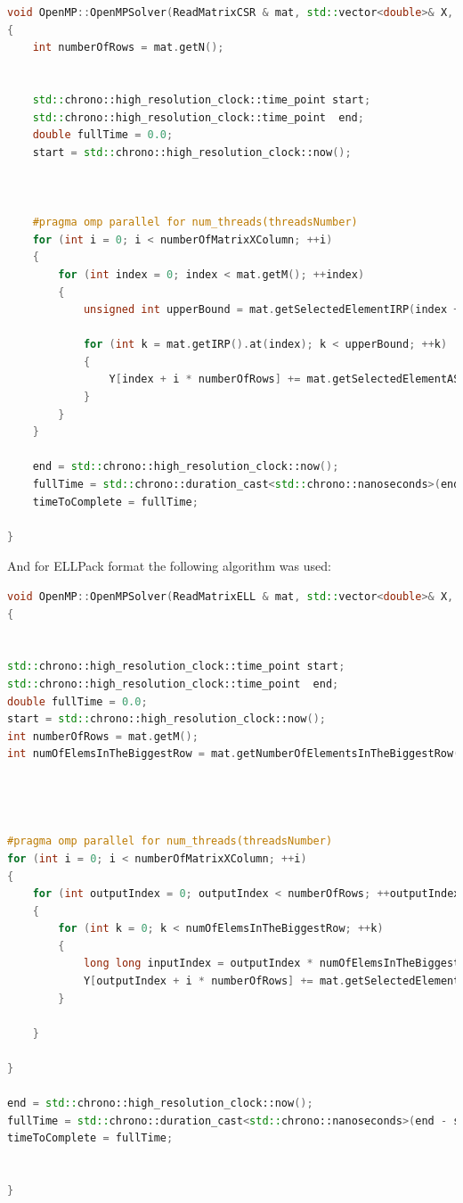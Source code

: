 \documentclass{scrreprt}
\begin{document}
\begin{lstlisting}[language=C++]
void OpenMP::OpenMPSolver(ReadMatrixCSR & mat, std::vector<double>& X, std::vector<double>& Y,  int threadsNumber, double & timeToComplete, unsigned int numberOfMatrixXColumn)
{
	int numberOfRows = mat.getN();


	std::chrono::high_resolution_clock::time_point start;
	std::chrono::high_resolution_clock::time_point  end;
	double fullTime = 0.0;
	start = std::chrono::high_resolution_clock::now();

	

	#pragma omp parallel for num_threads(threadsNumber)
	for (int i = 0; i < numberOfMatrixXColumn; ++i)
	{
		for (int index = 0; index < mat.getM(); ++index)
		{
			unsigned int upperBound = mat.getSelectedElementIRP(index + 1);

			for (int k = mat.getIRP().at(index); k < upperBound; ++k)
			{
				Y[index + i * numberOfRows] += mat.getSelectedElementAS(k) * X[mat.getSelectedElementJA(k)+ i * numberOfRows];
			}
		}
	}		

	end = std::chrono::high_resolution_clock::now();
	fullTime = std::chrono::duration_cast<std::chrono::nanoseconds>(end - start).count() / 1000000.0;
	timeToComplete = fullTime;	

}
\end{lstlisting}


And for ELLPack format the following algorithm was used:

\begin{lstlisting}[language=C++]
void OpenMP::OpenMPSolver(ReadMatrixELL & mat, std::vector<double>& X, std::vector<double>& Y, int threadsNumber, double & timeToComplete, unsigned int numberOfMatrixXColumn)
{	

	
std::chrono::high_resolution_clock::time_point start;
std::chrono::high_resolution_clock::time_point  end;
double fullTime = 0.0;
start = std::chrono::high_resolution_clock::now();
int numberOfRows = mat.getM();
int numOfElemsInTheBiggestRow = mat.getNumberOfElementsInTheBiggestRow();
	



#pragma omp parallel for num_threads(threadsNumber)
for (int i = 0; i < numberOfMatrixXColumn; ++i)
{
	for (int outputIndex = 0; outputIndex < numberOfRows; ++outputIndex)
	{
		for (int k = 0; k < numOfElemsInTheBiggestRow; ++k)
		{
			long long inputIndex = outputIndex * numOfElemsInTheBiggestRow + k;
			Y[outputIndex + i * numberOfRows] += mat.getSelectedElementAS(inputIndex) * X[mat.getSelectedElementJA(inputIndex) + i * numberOfRows] ;
		}

	}	

}

end = std::chrono::high_resolution_clock::now();
fullTime = std::chrono::duration_cast<std::chrono::nanoseconds>(end - start).count() / 1000000.0;
timeToComplete = fullTime;


}

\end{lstlisting}
\end{document}
